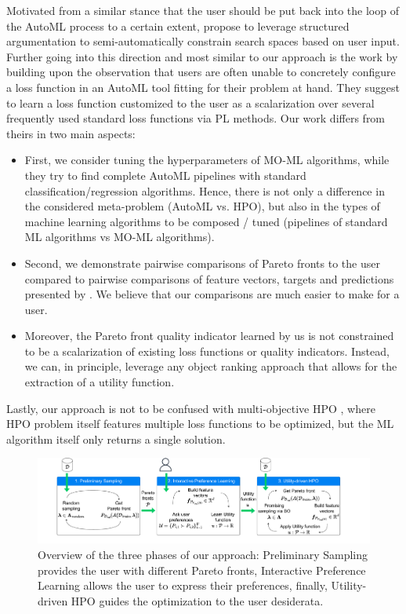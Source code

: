Motivated from a similar stance that the user should be put back into the loop of the AutoML process to a certain extent, \citet{francia-fgcs23a} propose to leverage structured argumentation to semi-automatically constrain search spaces based on user input. Further going into this direction and most similar to our approach is the work by \citet{kulbach-ecai20a} building upon the observation that users are often unable to concretely configure a loss function in an AutoML tool fitting for their problem at hand. They suggest to learn a loss function customized to the user as a scalarization over several frequently used standard loss functions via PL methods. Our work differs from theirs in two main aspects: 
\begin{itemize}[(1)]
    \item First, we consider tuning the hyperparameters of MO-ML algorithms, while they try to find complete AutoML pipelines with standard classification/regression algorithms. Hence, there is not only a difference in the considered meta-problem (AutoML vs. HPO), but also in the types of machine learning algorithms to be composed / tuned (pipelines of standard ML algorithms vs MO-ML algorithms).
    \item Second, we demonstrate pairwise comparisons of Pareto fronts to the user compared to pairwise comparisons of feature vectors, targets and predictions presented by \citet{kulbach-ecai20a}. We believe that our comparisons are much easier to make for a user.
    \item Moreover, the Pareto front quality indicator learned by us is not constrained to be a scalarization of existing loss functions or quality indicators. Instead, we can, in principle, leverage any object ranking approach that allows for the extraction of a utility function.
\end{itemize}

Lastly, our approach is not to be confused with multi-objective HPO \cite{moraleshernandez-arxiv21a,karl-arxiv22a}, where HPO problem itself features multiple loss functions to be optimized, but the ML algorithm itself only returns a single solution.

\begin{figure}[!ht]
\centering
\includegraphics[width=1\columnwidth]{chapters/human-centric/moo/img/method.pdf} 
\caption{Overview of the three phases of our approach: Preliminary Sampling provides the user with different Pareto fronts, Interactive Preference Learning allows the user to express their preferences, finally, Utility-driven HPO guides the optimization to the user desiderata.}
\label{moo-fig:method}
\end{figure}

